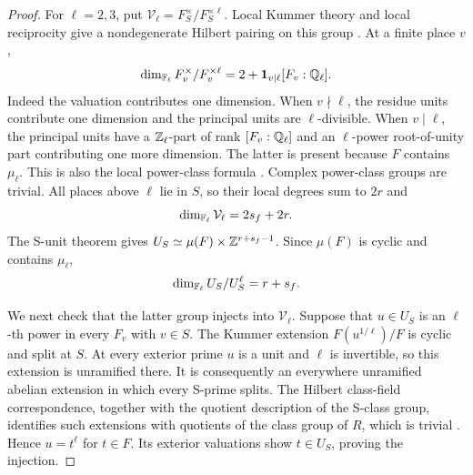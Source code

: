\begin{proof}
For \(\ell=2,3\), put \(\mathcal V_\ell=F_S^\times/F_S^{\times\ell}\).
Local Kummer theory and local reciprocity give a nondegenerate Hilbert
pairing on this group \cite[Chapter~V, Proposition~(3.2)]{Neukirch99}.
At a finite place \(v\),
\[
 \dim_{\mathbb{F}_\ell}F_v^\times/F_v^{\times\ell}
  =2+\mathbf{1}_{v\mid\ell}[F_v:\mathbb{Q}_\ell].
\]
Indeed the valuation contributes one dimension.  When \(v\nmid\ell\), the
residue units contribute one dimension and the principal units are
\(\ell\)-divisible.  When \(v\mid\ell\), the principal units have a
\(\mathbb{Z}_\ell\)-part of rank \([F_v:\mathbb{Q}_\ell]\) and an \(\ell\)-power
root-of-unity part contributing one more dimension.  The latter is present
because \(F\) contains \(\mu_\ell\).  This is also the local power-class
formula \cite[Chapter~II, Corollary~(5.8)]{Neukirch99}.
Complex power-class groups are trivial.
All places above \(\ell\) lie in \(S\), so their local degrees sum to \(2r\)
and
\begin{equation}
 \dim_{\mathbb{F}_\ell}\mathcal V_\ell=2s_f+2r.\label{eq:local-power-dimension}
\end{equation}
The S-unit theorem \cite[Chapter~I, Corollary~(11.7)]{Neukirch99} gives
\(U_S\simeq\mu(F)\times\mathbb{Z}^{r+s_f-1}\).  Since \(\mu(F)\) is cyclic and
contains \(\mu_\ell\),
\begin{equation}
 \dim_{\mathbb{F}_\ell}U_S/U_S^\ell=r+s_f.\label{eq:unit-power-dimension}
\end{equation}

We next check that the latter group injects into \(\mathcal V_\ell\).
Suppose that \(u\in U_S\) is an \(\ell\)-th power in every \(F_v\) with
\(v\in S\).  The Kummer extension \(F(u^{1/\ell})/F\) is cyclic and split
at \(S\).  At every exterior prime \(u\) is a unit and \(\ell\) is
invertible, so this extension is unramified there.  It is consequently an
everywhere unramified abelian extension in which every S-prime splits.
The Hilbert class-field correspondence, together with the quotient
description of the S-class group, identifies such extensions with quotients
of the class group of \(R\), which is trivial
\cite[Chapter~I, Proposition~(11.6); Chapter~VI, Proposition~(6.9) and
Theorem~(7.3)]{Neukirch99}.  Hence
\(u=t^\ell\) for \(t\in F\).  Its exterior valuations show \(t\in U_S\),
proving the injection.


\end{proof}
